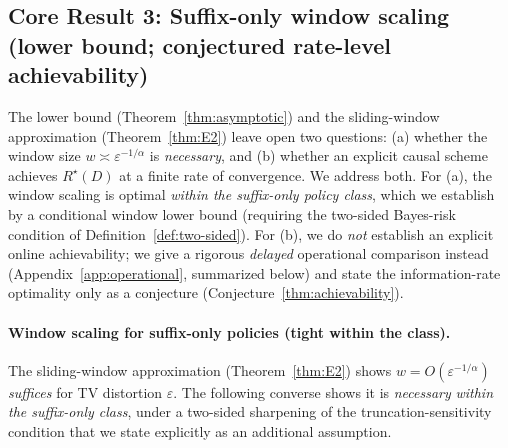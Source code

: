 \documentclass[11pt]{article}
\theoremstyle{plain}
\theoremstyle{definition}
\theoremstyle{remark}
\begin{document}
\subsection{Core Result 3: Suffix-only window scaling (lower bound; conjectured rate-level achievability)}
\label{sec:achievability}

The lower bound (Theorem~\ref{thm:asymptotic}) and the
sliding-window approximation (Theorem~\ref{thm:E2}) leave open two
questions: (a) whether the window size $w \asymp
\varepsilon^{-1/\alpha}$ is \emph{necessary}, and (b) whether an
explicit causal scheme achieves $R^\star(D)$ at a finite rate of
convergence. We address both. For (a), the window scaling is optimal
\emph{within the suffix-only policy class}, which we establish by a
conditional window lower bound (requiring the two-sided Bayes-risk
condition of Definition~\ref{def:two-sided}). For (b), we do
\emph{not} establish an explicit online achievability; we give a
rigorous \emph{delayed} operational comparison instead
(Appendix~\ref{app:operational}, summarized below) and state the
information-rate optimality only as a conjecture
(Conjecture~\ref{thm:achievability}).

\paragraph{Window scaling for suffix-only policies (tight within the class).}
The sliding-window approximation (Theorem~\ref{thm:E2}) shows
$w = O(\varepsilon^{-1/\alpha})$ \emph{suffices} for TV distortion
$\varepsilon$. The following converse shows it is \emph{necessary}
\emph{within the suffix-only class}, under a two-sided sharpening of
the truncation-sensitivity condition that we state explicitly as an
additional assumption.
\end{document}
